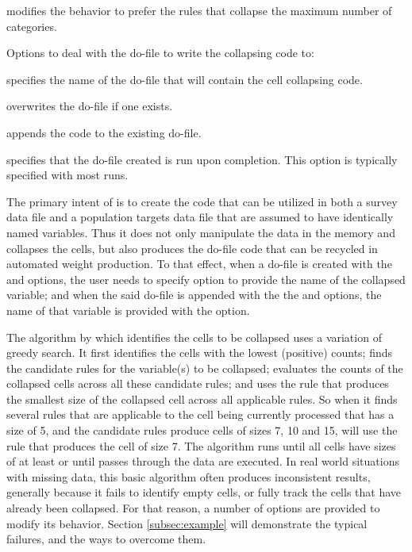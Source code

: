 \hangpara
{} modifies the behavior  to prefer the rules
that collapse the maximum number of categories.

Options to deal with the do-file to write the collapsing code to:	

\hangpara
{} specifies the name of the do-file that will contain the cell collapsing code.

\hangpara
{} overwrites the do-file if one exists.

\hangpara
{} appends the code to the existing do-file.

\hangpara
{} specifies that the do-file created is run upon completion. This option is typically specified with most runs.

The primary intent of  is to create the code that can be
utilized in both a survey data file and a population targets data file that
are assumed to have identically named variables. Thus it does not only manipulate the data in the memory
and collapses the cells, but also produces the do-file code that can be recycled in automated
weight production.
To that effect, when a do-file is created with the  and  options,
the user needs to specify  option to provide the name of the collapsed variable;
and when the said do-file is appended with the the  and  options,
the name of that variable is provided with the  option.

The algorithm by which  identifies the cells to be collapsed uses
a variation of greedy search.
It first identifies the cells with the lowest (positive) counts; finds the candidate rules
for the variable(s) to be collapsed; evaluates the counts of the collapsed cells across all
these candidate rules; and uses the rule that produces the smallest size of the
collapsed cell across all applicable rules. So when it finds several rules that are applicable
to the cell being currently processed that has a size of 5, and the candidate rules produce cells
of sizes 7, 10 and 15,  will use the rule that produces the cell
of size 7. The algorithm runs until all cells have sizes of at least
 or until  passes through the data are executed.
In real world situations with missing data, this basic algorithm often produces inconsistent
results, generally because it fails to identify empty cells, or fully track the cells
that have already been collapsed.
For that reason, a number of options are provided to modify its behavior.
Section \ref{subsec:example} will demonstrate the typical failures, and the ways to overcome them.

